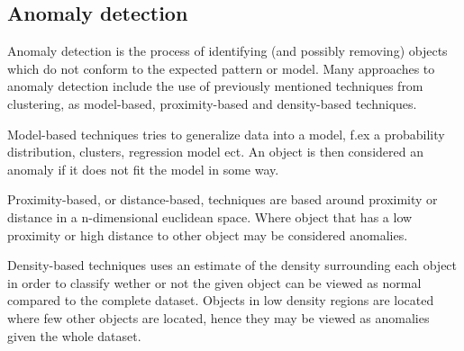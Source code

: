 \subsection{Anomaly detection}
	Anomaly detection is the process of identifying (and possibly removing) objects which do not conform to the expected pattern or model. 
	Many approaches to anomaly detection include the use of 
	previously mentioned techniques from clustering, as model-based, proximity-based and density-based techniques. 
	
	\bigskip\noindent
	Model-based techniques tries to generalize data into a model, 
	f.ex a probability distribution, clusters, regression model ect. 
	An object is then considered an anomaly if it does not fit the model in some way. 
	
	\bigskip\noindent
	Proximity-based, or distance-based, techniques are based around proximity or distance in a n-dimensional euclidean space. 
	Where object that has a low proximity or high distance to other object may be considered anomalies.
	
	\bigskip\noindent
	Density-based techniques uses an estimate of the density surrounding each object in order to classify wether or not the given object can be viewed as normal compared to the complete dataset. Objects in low density regions are located where few other objects are located, hence they may be viewed as anomalies given the whole dataset.
	
